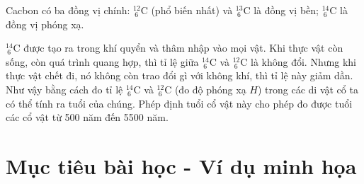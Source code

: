 Cacbon có ba đồng vị chính: $^{12}_{\ 6}\text{C}$ (phổ biến nhất) và $^{13}_{\ 6}\text{C}$ là đồng vị bền; $^{14}_{\ 6}\text{C}$ là đồng vị phóng xạ.

$^{14}_{\ 6}\text{C}$ được tạo ra trong khí quyển và thâm nhập vào mọi vật. Khi thực vật còn sống, còn quá trình quang hợp, thì tỉ lệ giữa $^{14}_{\ 6}\text{C}$ và $^{12}_{\ 6}\text{C}$ là không đổi. Nhưng khi thực vật chết đi, nó không còn trao đổi gì với không khí, thì tỉ lệ này giảm dần. Như vậy bằng cách đo tỉ lệ $^{14}_{\ 6}\text{C}$ và $^{12}_{\ 6}\text{C}$ (đo độ phóng xạ $H$) trong các di vật cổ ta có thể tính ra tuổi của chúng. Phép định tuổi cổ vật này cho phép đo được tuổi các cổ vật từ 500 năm đến 5500 năm.

\section{Mục tiêu bài học - Ví dụ minh họa}

